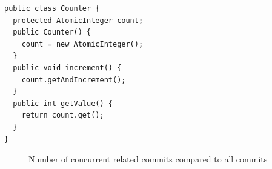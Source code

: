 \begin{lstlisting}
public class Counter {
  protected AtomicInteger count;
  public Counter() {
    count = new AtomicInteger();
  }
  public void increment() {
    count.getAndIncrement();
  }
  public int getValue() {
    return count.get();
  }
}
\end{lstlisting}
\begin{figure}
	\centering
	\caption{Number of concurrent related commits compared to all commits}
	\label{fig:confidence}
\end{figure}

